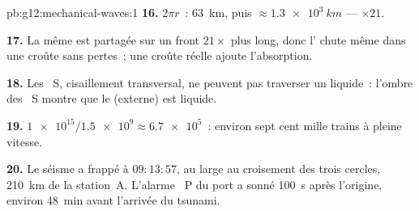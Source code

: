 \begin{solution}{pb:g12:mechanical-waves:1}
\textbf{16.} $2\pi r$~: \qty{63}{km}, puis $\approx \qty{1.3e3}{km}$
--- $\times 21$.

\textbf{17.} La même  est partagée sur un front $21\times$
plus long, donc l' chute même dans une croûte sans
pertes~; une croûte réelle ajoute l'absorption.

\textbf{18.} Les ~S, cisaillement transversal, ne
peuvent pas traverser un liquide~: l'ombre des ~S montre que
le  (externe) est liquide.

\textbf{19.} $\num{1e15}/\num{1.5e9} \approx \num{6.7e5}$~: environ
sept cent mille trains à pleine vitesse.

\textbf{20.} Le séisme a frappé à $09{:}13{:}57$, au large au croisement
des trois cercles, \qty{210}{km} de la station~A. L'alarme
~P du port a sonné \qty{100}{s} après l'origine, environ
\qty{48}{min} avant l'arrivée du tsunami.
\end{solution}
